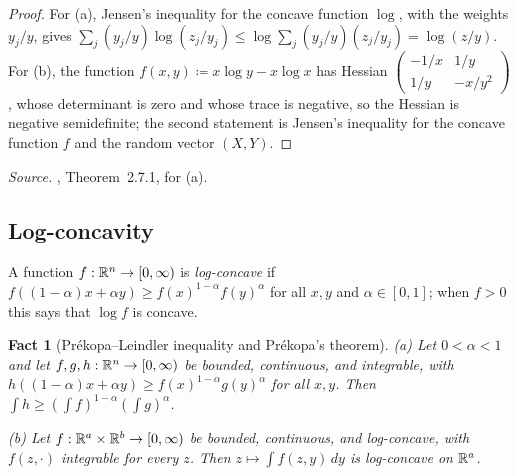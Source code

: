 \documentclass[11pt,letterpaper]{article}
\theoremstyle{plain}
\newtheorem{fact}{Fact}[section]
\begin{document}
\begin{proof}
For (a), Jensen's inequality for the concave function \(\log\), with the
weights \(y_j/y\), gives \(\sum_j(y_j/y)\log(z_j/y_j)\le\log\sum_j(y_j/y)(z_j/y_j)
=\log(z/y)\). For (b), the function \(f(x,y)\coloneqq x\log y-x\log x\) has Hessian
\(\begin{pmatrix}-1/x&1/y\\1/y&-x/y^2\end{pmatrix}\), whose determinant is
zero and whose trace is negative, so the Hessian is negative semidefinite;
the second statement is Jensen's inequality for the concave function
\(f\) and the random vector \((X,Y)\).
\end{proof}

\emph{Source.} , Theorem~2.7.1, for (a).

\subsection{Log-concavity}\label{tb:sec:logconcave}

A function \(f:\mathbb R^n\to[0,\infty)\) is \emph{log-concave} if
\(f((1-\alpha)x+\alpha y)\ge f(x)^{1-\alpha}f(y)^\alpha\) for all \(x,y\) and \(\alpha\in[0,1]\);
when \(f>0\) this says that \(\log f\) is concave.

\begin{fact}[Pr\'ekopa--Leindler inequality and Pr\'ekopa's theorem]
\label{tb:prekopa}
(a) Let \(0<\alpha<1\) and let \(f,g,h:\mathbb R^n\to[0,\infty)\) be bounded,
continuous, and integrable, with
\(h((1-\alpha)x+\alpha y)\ge f(x)^{1-\alpha}g(y)^\alpha\) for all \(x,y\). Then
\(\int h\ge(\int f)^{1-\alpha}(\int g)^\alpha\).

(b) Let \(f:\mathbb R^a\times\mathbb R^b\to[0,\infty)\) be bounded, continuous, and
log-concave, with \(f(z,\cdot)\) integrable for every \(z\). Then
\(z\mapsto\int f(z,y)\,dy\) is log-concave on \(\mathbb R^a\).
\end{fact}
\end{document}
